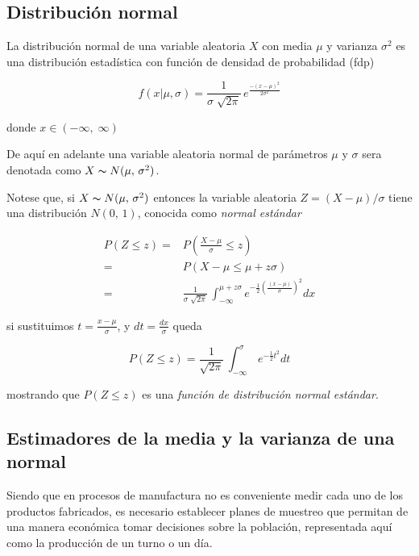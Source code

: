 \documentclass[spanish]{report}
\begin{document}
\subsection{Distribución normal}

La distribución normal de una variable aleatoria $X$ con media $\mu$
y varianza $\sigma^2$ es una distribución estadística
con función de densidad de probabilidad (fdp)

\begin{equation}
f(x|\mu,\sigma)=\frac{1}{\sigma\;\sqrt{2\pi}}\,e^{\frac{-(x-\mu)^{2}}{2\sigma^{2}}}
\label{c2eq1}
\end{equation}


donde $x\in(-\infty,\;\infty)$

De aquí en adelante una variable aleatoria normal de parámetros $\mu$
y $\sigma$ sera denotada como $X\thicksim N(\mu,\,\sigma^2)$.

Notese que, si $X\thicksim N(\mu,\,\sigma^2)$
entonces la variable aleatoria $Z=(X-\mu)/\sigma$ tiene una distribución
$N(0,\,1)$, conocida como \emph{normal estándar} 

\begin{align*}
P(Z\leq z)= & P(\frac{X-\mu}{\sigma}\leq z)\\
= & P(X-\mu\leq\mu+z\sigma)\\
= & \frac{1}{\sigma\;\sqrt{2\pi}}\,\int_{-\infty}^{\mu+z\sigma}e^{-\frac{1}{2}(\frac{(x-\mu)}{\sigma})^{2}}dx
\end{align*}

si sustituimos $t=\frac{x-\mu}{\sigma}$, y $dt=\frac{dx}{\sigma}$
queda

\begin{equation}
P(Z\leq z) = \frac{1}{\sqrt{2\pi}} \,\int_{-\infty}^{\sigma}\,e^{-\frac{1}{2}t^2}dt
\label{c2eq2}
\end{equation}

mostrando que $P(Z\leq z)$ es una \emph{función de distribución normal
estándar}. 


\subsection{Estimadores de la media y la varianza de una normal}

Siendo que en procesos de manufactura no es conveniente medir cada
uno de los productos fabricados, es necesario establecer planes de
muestreo que permitan de una manera económica tomar decisiones sobre
la población, representada aquí como la producción de un turno o un
día.
\end{document}
